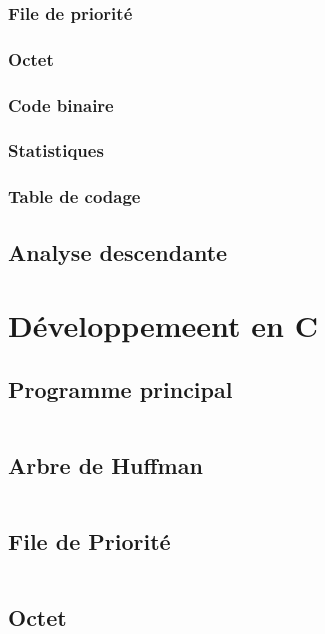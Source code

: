 \documentclass[12pt,a4paper]{article}
\begin{document}
\subsubsection{File de priorité}

\subsubsection{Octet}

\subsubsection{Code binaire}

\subsubsection{Statistiques}

\subsubsection{Table de codage}

\subsection{Analyse descendante}
%

\newpage

\section{Développemeent en C}
\subsection{Programme principal}
    \inputminted[breaklines]{c}{../code/src/main.c}
\subsection{Arbre de Huffman}
    \inputminted[breaklines]{c}{../code/src/arbre.c}
\subsection{File de Priorité}
    \inputminted[breaklines]{c}{../code/src/fileDePriorite.c}
\subsection{Octet}
    \inputminted[breaklines]{c}{../code/src/octet.c}
\end{document}
